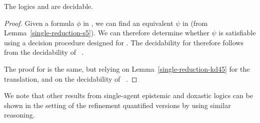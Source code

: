 
\begin{theorem}\label{single-decidable}
The logics \logicSiF{} and \logicKDiF{} are decidable.
\end{theorem}

\begin{proof}
Given a formula $\phi$ in \logicSiF{}, we can find an equivalent $\psi$ in
\logicSi{} (from Lemma~\ref{single-reduction-s5}). We can therefore determine whether
$\psi$ is satisfiable using a decision procedure designed for \logicSi{}. The
decidability for \logicSiF{} therefore follows from the decidability of
\logicSi{}~\cite{blackburn2002modal}.

The proof for \logicKDiF{} is the same, but relying on
Lemma~\ref{single-reduction-kd45} for the translation, and on the decidability of
\logicKDi{}~\cite{blackburn2002modal}.
\end{proof}

We note that other results from single-agent epistemic and doxastic logics can
be shown in the setting of the refinement quantified versions by using similar
reasoning.
